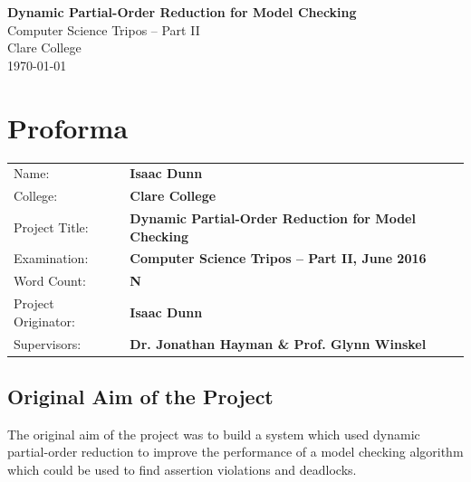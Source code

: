\documentclass[12pt,a4paper,twoside,openright]{report}
\begin{document}





\pagestyle{empty}


\vspace*{60mm}
\begin{center}
\Huge
\textbf{Dynamic Partial-Order Reduction for Model Checking} \\[7mm]
Computer Science Tripos -- Part II \\[6mm]
Clare College \\[7mm]
\LARGE \today  %
\end{center}


\pagestyle{plain}

\chapter*{Proforma}

{\large
\begin{tabular}{ll}
Name:           & \bf Isaac Dunn                            			 \\
College:        & \bf Clare College                    				     \\
Project Title:	& \bf Dynamic Partial-Order Reduction for Model Checking \\
Examination:    & \bf Computer Science Tripos -- Part II, June 2016      \\
Word Count:     & \bf N    												 \\
Project Originator: & \bf Isaac Dunn\footnotemark[1] 					 \\
Supervisors:	& \bf Dr. Jonathan Hayman \& Prof. Glynn Winskel         \\
\end{tabular}
}


\section*{Original Aim of the Project}

The original aim of the project was to build a system which
used dynamic partial-order reduction to improve the performance
of a model checking algorithm which could be used to find
assertion violations and deadlocks.
\end{document}
